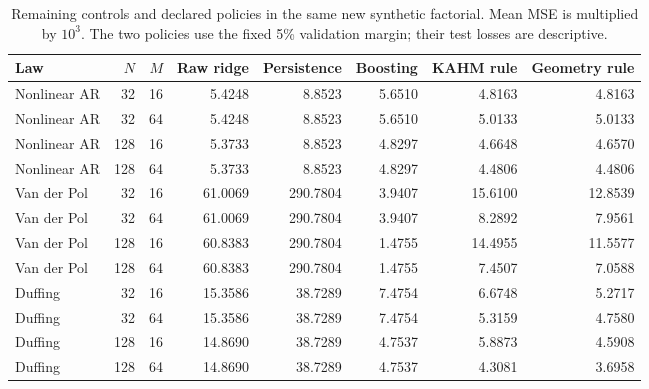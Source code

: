 \begin{table}[!htbp]
\centering\small\setlength{\tabcolsep}{4pt}
\caption{Remaining controls and declared policies in the same new synthetic factorial. Mean MSE is multiplied by $10^3$. The two policies use the fixed 5\% validation margin; their test losses are descriptive.}
\label{tab:utility-synthetic-controls}
\begin{tabular}{lrrrrrrr}
\toprule
Law & $N$ & $M$ & Raw ridge & Persistence & Boosting & KAHM rule & Geometry rule \\
\midrule
Nonlinear AR & 32 & 16 & 5.4248 & 8.8523 & 5.6510 & 4.8163 & 4.8163 \\
Nonlinear AR & 32 & 64 & 5.4248 & 8.8523 & 5.6510 & 5.0133 & 5.0133 \\
Nonlinear AR & 128 & 16 & 5.3733 & 8.8523 & 4.8297 & 4.6648 & 4.6570 \\
Nonlinear AR & 128 & 64 & 5.3733 & 8.8523 & 4.8297 & 4.4806 & 4.4806 \\
Van der Pol & 32 & 16 & 61.0069 & 290.7804 & 3.9407 & 15.6100 & 12.8539 \\
Van der Pol & 32 & 64 & 61.0069 & 290.7804 & 3.9407 & 8.2892 & 7.9561 \\
Van der Pol & 128 & 16 & 60.8383 & 290.7804 & 1.4755 & 14.4955 & 11.5577 \\
Van der Pol & 128 & 64 & 60.8383 & 290.7804 & 1.4755 & 7.4507 & 7.0588 \\
Duffing & 32 & 16 & 15.3586 & 38.7289 & 7.4754 & 6.6748 & 5.2717 \\
Duffing & 32 & 64 & 15.3586 & 38.7289 & 7.4754 & 5.3159 & 4.7580 \\
Duffing & 128 & 16 & 14.8690 & 38.7289 & 4.7537 & 5.8873 & 4.5908 \\
Duffing & 128 & 64 & 14.8690 & 38.7289 & 4.7537 & 4.3081 & 3.6958 \\
\bottomrule
\end{tabular}
\end{table}
